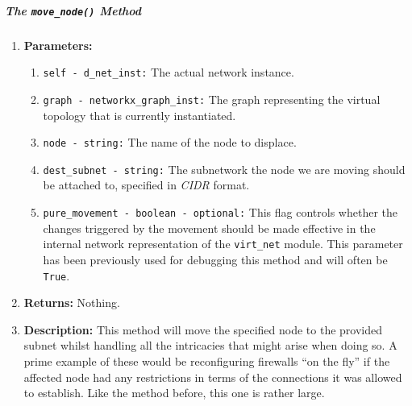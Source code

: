    \subparagraph{The \texttt{move\_node()} Method}
        \begin{enumerate}
            \item \textbf{Parameters:}
            \begin{enumerate}
                \item \texttt{self - d\_net\_inst:} The actual network instance.
                \item \texttt{graph - networkx\_graph\_inst:} The graph representing the virtual topology that is currently instantiated.
                \item \texttt{node - string:} The name of the node to displace.
                \item \texttt{dest\_subnet - string:} The subnetwork the node we are moving should be attached to, specified in \textit{CIDR} format.
                \item \texttt{pure\_movement - boolean - optional:} This flag controls whether the changes triggered by the movement should be made effective in the internal network representation of the \texttt{virt\_net} module. This parameter has been previously used for debugging this method and will often be \texttt{True}.
            \end{enumerate}
            \item \textbf{Returns:} Nothing.
            \item \textbf{Description:} This method will move the specified node to the provided subnet whilst handling all the intricacies that might arise when doing so. A prime example of these would be reconfiguring firewalls ``on the fly'' if the affected node had any restrictions in terms of the connections it was allowed to establish. Like the method before, this one is rather large.
        \end{enumerate}
